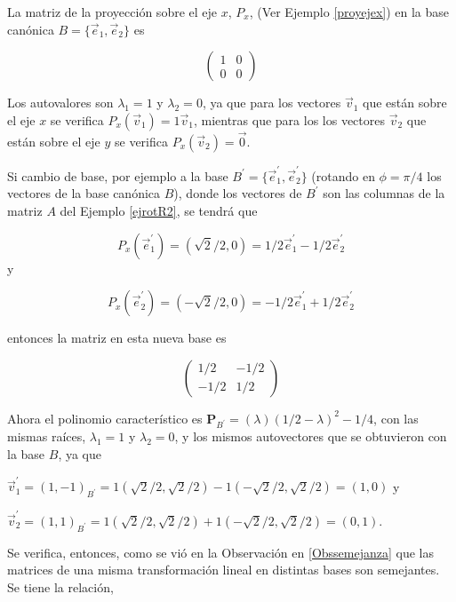 \begin{example}
La matriz de la proyección sobre el eje $x$, $ P_x$, (Ver Ejemplo \ref{proyejex}) en la base canónica $B=\{\vec{e}_1, \vec{e}_2 \}  $ es 

$$\left(\begin{array}{cc}  1 & 0  \\ 0 &  0
\end{array}
 \right)$$

 \bigskip
 
 Los autovalores son $\lambda_1=1$ y $\lambda_2=0$, ya que para los vectores $\vec{v}_1$ que están sobre el eje $x$ se verifica $P_x(\vec{v}_1)=1 \vec{v}_1$, mientras que para los los vectores $\vec{v}_2$ que están sobre el eje $y$ se verifica $P_x(\vec{v}_2)=\Vec{0}$.
 
\bigskip
Si cambio de base, por ejemplo a la base $B^{\prime}= \{\vec{e}_1^{\prime}, \vec{e}_2^{\prime} \} $ (rotando  en $ \phi= \pi/4$ los vectores de la base canónica $B$),  donde los vectores de $B^{\prime}$ son las columnas de la matriz $A$ del Ejemplo \ref{ejrotR2}, se tendrá que 

$$ P_x( \vec{e}_1^{\prime})=(\sqrt 2/2,0)= 1/2 \vec{e}_1^{\prime} -1/2 \vec{e}_2^{\prime} $$
y 

$$ P_x( \vec{e}_2^{\prime})=(-\sqrt 2 /2,0)= -1/2 \vec{e}_1^{\prime} +1/2 \vec{e}_2^{\prime} $$

\noindent
entonces la matriz en esta nueva base es

$$\left(\begin{array}{cc}  1/2 & -1/2  \\ -1/2 &  1/2
\end{array}
 \right)$$

 \bigskip

 Ahora el polinomio característico es $\mathbf{P}_{B^{\prime}}=(\lambda)(1/2-\lambda)^2 -1/4$, con las mismas raíces, $\lambda_1=1$ y $\lambda_2=0$, y los mismos autovectores que se obtuvieron con la base $B$, ya que

 \bigskip
 
 $\vec{v}^{\prime}_1= (1,-1)_{B^{\prime}}= 1(\sqrt 2 /2,\sqrt 2 /2)-1(-\sqrt 2 /2,\sqrt 2 /2)=(1,0)$ y
 
 \bigskip
 
 $\vec{v}^{\prime}_2= (1,1)_{B^{\prime}}=1(\sqrt 2 /2,\sqrt 2 /2)+1(-\sqrt 2 /2,\sqrt 2 /2)=(0,1)$.

 \bigskip
 
 Se verifica, entonces, como se vió en la  Observación 
 \textcolor{blue}{{\selectfont{i}}} en  \ref{Obssemejanza} que las matrices de una misma transformación lineal en distintas bases son semejantes.  
Se tiene la relación, 


\end{example}
